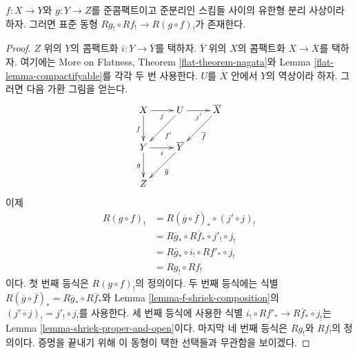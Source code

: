\begin{lemma}
\label{lemma-shriek-composition}
$f : X \to Y$와 $g : Y \to Z$를 준콤팩트이고 준분리인 스킴들 사이의
유한형 분리 사상이라 하자. 그러면 표준 동형
$Rg_! \circ Rf_! \to R(g \circ f)_!$가 존재한다.
\end{lemma}

\begin{proof}
$Z$ 위의 $Y$의 콤팩트화 $i : Y \to \overline{Y}$를 택하자.
$\overline{Y}$ 위의 $X$의 콤팩트화 $X \to \overline{X}$를 택하자.
여기에는 More on Flatness, Theorem \ref{flat-theorem-nagata}와
Lemma \ref{flat-lemma-compactifyable}를 각각 두 번 사용한다.
$U$를 $\overline{X}$ 안에서 $Y$의 역상이라 하자. 그러면 다음 가환
그림을 얻는다.
$$
\xymatrix{
X \ar[r]_j \ar[d]_f &
U \ar[dl]^{f'} \ar[r]_{j'} &
\overline{X} \ar[dl]^{\overline{f}} \\
Y \ar[r]_i \ar[d]_g &
\overline{Y} \ar[dl]^{\overline{g}} \\
Z
}
$$
이제
\begin{align*}
R(g \circ f)_!
& =
R(\overline{g} \circ \overline{f})_* \circ (j' \circ j)_! \\
& =
R\overline{g}_* \circ R\overline{f}_* \circ j'_! \circ j_! \\
& =
R\overline{g}_* \circ i_! \circ Rf'_* \circ j_! \\
& =
Rg_! \circ Rf_!
\end{align*}
이다. 첫 번째 등식은 $R(g \circ f)_!$의 정의이다.
두 번째 등식에는 식별
$R(\overline{g} \circ \overline{f})_* = R\overline{g}_* \circ R\overline{f}_*$와
Lemma \ref{lemma-f-shriek-composition}의
$(j' \circ j)_! = j'_! \circ j_!$를 사용한다.
세 번째 등식에 사용한 식별
$i_! \circ Rf'_* \to R\overline{f}_* \circ j_!$는 Lemma
\ref{lemma-shriek-proper-and-open}이다.
마지막 네 번째 등식은 $Rg_!$와 $Rf_!$의 정의이다.
증명을 끝내기 위해 이 동형이 택한 선택들과 무관함을 보이겠다.



\end{proof}
